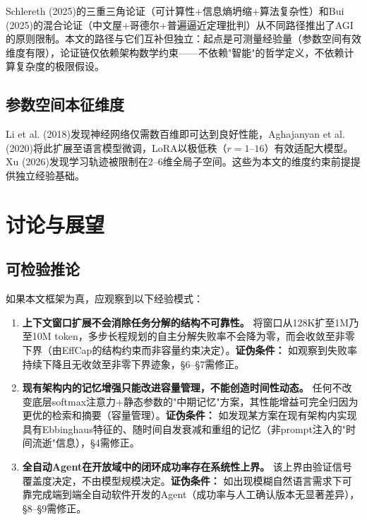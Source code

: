\documentclass[11pt,a4paper]{ctexart}
\begin{document}
Schlereth (2025)\cite{Schlereth2025ICB}的三重三角论证（可计算性+信息熵坍缩+算法复杂性）和Bui (2025)\cite{Bui2025Foundations}的混合论证（中文屋+哥德尔+普遍逼近定理批判）从不同路径推出了AGI的原则限制。本文的路径与它们互补但独立：起点是可测量经验量（参数空间有效维度有限），论证链仅依赖架构数学约束——不依赖"智能"的哲学定义，不依赖计算复杂度的极限假设。

\subsection{参数空间本征维度}

Li et al. (2018)\cite{Li2018IntrinsicDim}发现神经网络仅需数百维即可达到良好性能，Aghajanyan et al. (2020)\cite{Aghajanyan2020}将此扩展至语言模型微调，LoRA\cite{Hu2021LoRA}以极低秩（$r=1$--$16$）有效适配大模型。Xu (2026)\cite{Xu2026Holographic}发现学习轨迹被限制在2--6维全局子空间。这些为本文的维度约束前提提供独立经验基础。


\section{讨论与展望}

\subsection{可检验推论}

如果本文框架为真，应观察到以下经验模式：

\begin{enumerate}[leftmargin=*,label=\textbf{T\arabic*}.]
    \item \textbf{上下文窗口扩展不会消除任务分解的结构不可靠性。} 将窗口从128K扩至1M乃至10M token，多步长程规划的自主分解失败率不会降为零，而会收敛至非零下界（由EffCap的结构约束而非容量约束决定）。\textbf{证伪条件：} 如观察到失败率持续下降且无收敛至非零下界迹象，§6--§7需修正。

    \item \textbf{现有架构内的记忆增强只能改进容量管理，不能创造时间性动态。} 任何不改变底层softmax注意力+静态参数的"中期记忆"方案，其性能增益可完全归因为更优的检索和摘要（容量管理）。\textbf{证伪条件：} 如发现某方案在现有架构内实现具有Ebbinghaus特征的、随时间自发衰减和重组的记忆（非prompt注入的"时间流逝"信息），§4需修正。

    \item \textbf{全自动Agent在开放域中的闭环成功率存在系统性上界。} 该上界由验证信号覆盖度决定，不由模型规模决定。\textbf{证伪条件：} 如出现模糊自然语言需求下可靠完成端到端全自动软件开发的Agent（成功率与人工确认版本无显著差异），§8--§9需修正。
\end{enumerate}
\end{document}

